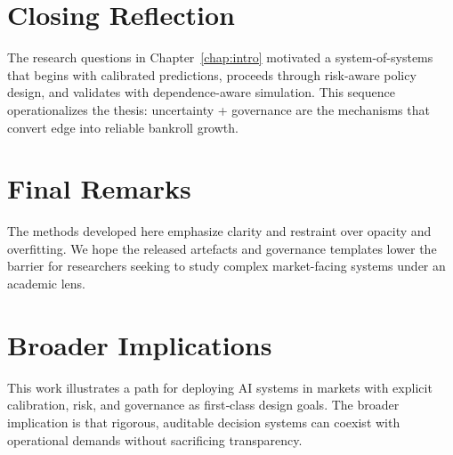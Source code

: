 \section{Closing Reflection}
The research questions in Chapter~\ref{chap:intro} motivated a system-of-systems that begins with calibrated predictions, proceeds through risk-aware policy design, and validates with dependence-aware simulation. This sequence operationalizes the thesis: uncertainty + governance are the mechanisms that convert edge into reliable bankroll growth.

\section{Final Remarks}
The methods developed here emphasize clarity and restraint over opacity and overfitting. We hope the released artefacts and governance templates lower the barrier for researchers seeking to study complex market-facing systems under an academic lens.

\section{Broader Implications}
This work illustrates a path for deploying AI systems in markets with explicit calibration, risk, and governance as first‑class design goals. The broader implication is that rigorous, auditable decision systems can coexist with operational demands without sacrificing transparency.
